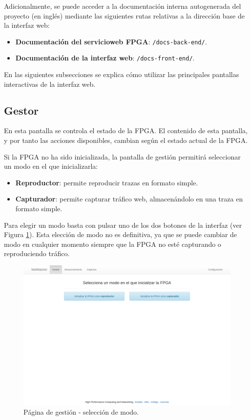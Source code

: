 Adicionalmente, se puede acceder a la documentación interna autogenerada del proyecto (en inglés) mediante las siguientes rutas relativas a la dirección base de la interfaz web:
\begin{itemize}
  \item \textbf{Documentación del \gls{servicioweb} \gls{FPGA}}: \texttt{/docs-back-end/}.
  \item \textbf{Documentación de la interfaz web}: \texttt{/docs-front-end/}.
\end{itemize}

En las siguientes subsecciones se explica cómo utilizar las principales pantallas interactivas de la interfaz web.


\subsection{Gestor\label{extra:manual:gestor}}

En esta pantalla se controla el estado de la \gls{FPGA}. El contenido de esta pantalla, y por tanto las acciones disponibles, cambian según el estado actual de la \gls{FPGA}.

Si la \gls{FPGA} no ha sido inicializada, la pantalla de gestión permitirá seleccionar un modo en el que inicializarla:
\begin{itemize}
  \item \textbf{Reproductor}: permite reproducir \glspl{traza} en formato \gls{simple}.
  \item \textbf{Capturador}: permite capturar tráfico web, almacenándolo en una \gls{traza} en formato \gls{simple}.
\end{itemize}

Para elegir un modo basta con pulsar uno de los dos botones de la interfaz (ver Figura \ref{fig:captura:gestionseleccion}). Esta elección de modo no es definitiva, ya que se puede cambiar de modo en cualquier momento siempre que la \gls{FPGA} no esté capturando o reproduciendo tráfico.

\begin{figure}[!htp]
  \centering
  \includegraphics[width=\textwidth,clip=true]{graphics/capturas/gestor_seleccion}
  \caption{Página de gestión - selección de modo.}
  \label{fig:captura:gestionseleccion}
\end{figure}

